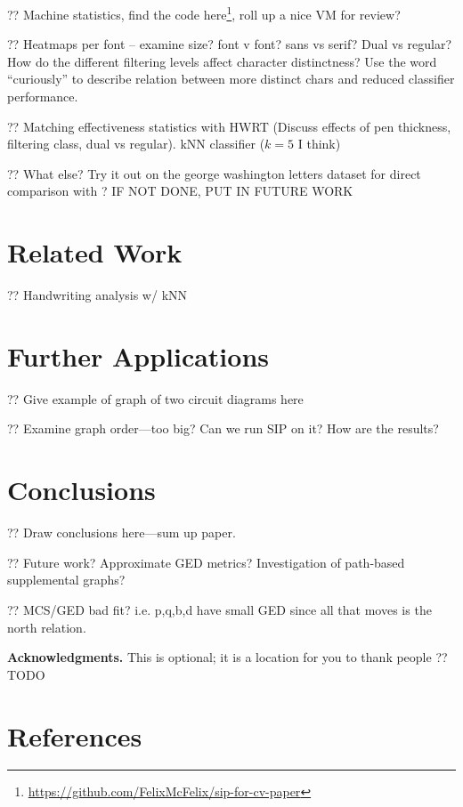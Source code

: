 \documentclass{mpaper}
\begin{document}
?? Machine statistics, find the code here\footnote{\url{https://github.com/FelixMcFelix/sip-for-cv-paper}}, roll up a nice VM for review?

?? Heatmaps per font -- examine size? font v font? sans vs serif? Dual vs regular? How do the different filtering levels affect character distinctness? Use the word ``curiously'' to describe relation between more distinct chars and reduced classifier performance.

?? Matching effectiveness statistics with HWRT \cite{HwrtDatabase} (Discuss effects of pen thickness, filtering class, dual vs regular). kNN classifier ($k=5$ I think)

?? What else? Try it out on the george washington letters dataset for direct comparison with \cite{Graphs-Handwriting}? IF NOT DONE, PUT IN FUTURE WORK

\section{Related Work}
\label{sec:related}

?? Handwriting analysis w/ kNN \cite{Graphs-Handwriting}

\section{Further Applications}
\label{sec:applications}

?? Give example of graph of two circuit diagrams here

?? Examine graph order---too big? Can we run SIP on it? How are the results?

\section{Conclusions}
\label{sec:conclusion}

?? Draw conclusions here---sum up paper.

?? Future work? Approximate GED metrics? Investigation of path-based supplemental graphs?

?? MCS/GED bad fit? i.e. p,q,b,d have small GED since all that moves is the north relation.

\noindent
{\bf Acknowledgments.}
This is optional; it is a location for you to thank people ?? TODO

\section{References}
\printbibliography[heading=none]

\vspace{1em}
\end{document}

